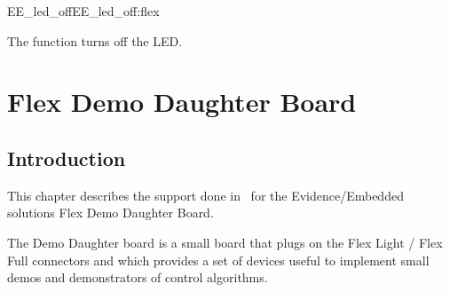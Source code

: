 \begin{function_nopb2}{EE\_led\_off}{EE_led_off:flex}
  
  \begin{fundescription}
    The function turns off the LED.
  \end{fundescription}
  
  
  
\end{function_nopb2}
















\chapter[Flex Demo Daughter Board]{Flex Demo Daughter Board}

\section{Introduction}

This chapter describes the support done in \ee\ for the
Evidence/Embedded solutions Flex Demo Daughter Board.

The Demo Daughter board is a small board that plugs on the Flex Light
/ Flex Full connectors and which provides a set of devices useful to
implement small demos and demonstrators of control algorithms.


